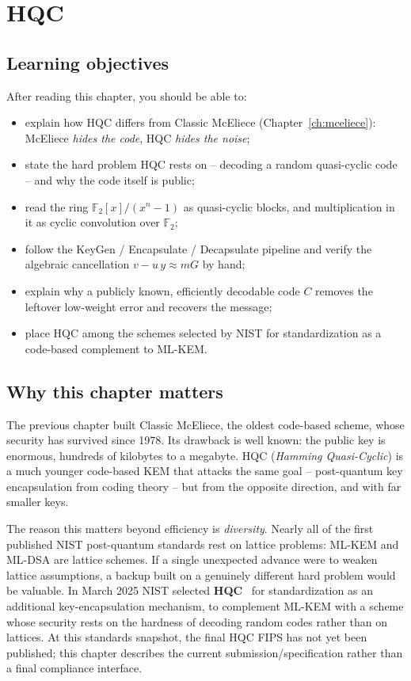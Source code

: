 \chapter{HQC}
\label{ch:hqc}

\section{Learning objectives}

After reading this chapter, you should be able to:

\begin{itemize}
  \item explain how HQC differs from Classic McEliece (Chapter~\ref{ch:mceliece}): McEliece \emph{hides the code}, HQC \emph{hides the noise};
  \item state the hard problem HQC rests on -- decoding a random quasi-cyclic code -- and why the code itself is public;
  \item read the ring $\mathbb{F}_2[x]/(x^n-1)$ as quasi-cyclic blocks, and multiplication in it as cyclic convolution over $\mathbb{F}_2$;
  \item follow the KeyGen / Encapsulate / Decapsulate pipeline and verify the algebraic cancellation $v - u\,y \approx mG$ by hand;
  \item explain why a publicly known, efficiently decodable code $C$ removes the leftover low-weight error and recovers the message;
  \item place HQC among the schemes selected by NIST for standardization as a code-based complement to ML-KEM.
\end{itemize}

\section{Why this chapter matters}

The previous chapter built Classic McEliece, the oldest code-based scheme, whose security has survived since 1978. Its drawback is well known: the public key is enormous, hundreds of kilobytes to a megabyte. HQC (\emph{Hamming Quasi-Cyclic}) is a much younger code-based KEM that attacks the same goal -- post-quantum key encapsulation from coding theory -- but from the opposite direction, and with far smaller keys.

The reason this matters beyond efficiency is \emph{diversity}. Nearly all of the first published NIST post-quantum standards rest on lattice problems: ML-KEM and ML-DSA are lattice schemes. If a single unexpected advance were to weaken lattice assumptions, a backup built on a genuinely different hard problem would be valuable. In March 2025 NIST selected \textbf{HQC}~\cite{hqc2017} for standardization as an additional key-encapsulation mechanism, to complement ML-KEM with a scheme whose security rests on the hardness of decoding random codes rather than on lattices. At this standards snapshot, the final HQC FIPS has not yet been published; this chapter describes the current submission/specification rather than a final compliance interface.

